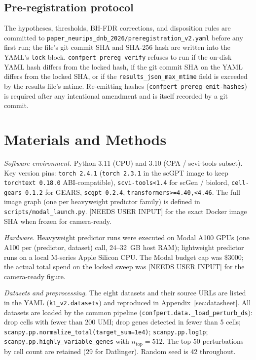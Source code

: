 \documentclass[11pt]{article}
\newcommand{\userinput}{{\color{orange}\textsf{[NEEDS USER INPUT]}}}
\begin{document}
\subsection{Pre-registration protocol}
The hypotheses, thresholds, BH-FDR corrections, and disposition rules
are committed to \texttt{paper\_neurips\_dnb\_2026/preregistration\_v2.yaml}
before any first run; the file's git commit SHA and SHA-256 hash are
written into the YAML's \texttt{lock} block. \texttt{confpert prereg
verify} refuses to run if the on-disk YAML hash differs from the locked
hash, if the git commit SHA on the YAML differs from the locked SHA, or
if the \texttt{results\_json\_max\_mtime} field is exceeded by the
results file's mtime. Re-emitting hashes
(\texttt{confpert prereg emit-hashes}) is required after any
intentional amendment and is itself recorded by a git commit.

\section{Materials and Methods}
\label{sec:methods}

\noindent\emph{Software environment.}
Python 3.11 (CPU) and 3.10 (CPA / scvi-tools subset). Key version pins:
\texttt{torch 2.4.1} (\texttt{torch 2.3.1} in the scGPT image to keep
\texttt{torchtext 0.18.0} ABI-compatible), \texttt{scvi-tools<1.4} for
scGen / biolord, \texttt{cell-gears 0.1.2} for GEARS,
\texttt{scgpt 0.2.4}, \texttt{transformers>=4.40,<4.46}. The full image
graph (one per heavyweight predictor family) is defined in
\texttt{scripts/modal\_launch.py}. \userinput{} for the exact Docker
image SHA when frozen for camera-ready.

\noindent\emph{Hardware.}
Heavyweight predictor runs were executed on Modal A100 GPUs (one A100
per (predictor, dataset) call, 24--32~GB host RAM); lightweight predictor
runs on a local M-series Apple Silicon CPU. The Modal budget cap was
\$3000; the actual total spend on the locked sweep was \userinput{} for
the camera-ready figure.

\noindent\emph{Datasets and preprocessing.}
The eight datasets and their source URLs are listed in the YAML
(\texttt{k1\_v2.datasets}) and reproduced in
Appendix~\ref{sec:datasheet}. All datasets are loaded by the
common pipeline (\texttt{confpert.data.\_load\_perturb\_ds}): drop
cells with fewer than 200 UMI; drop genes detected in fewer than 5
cells; \texttt{scanpy.pp.normalize\_total(target\_sum=1e4)};
\texttt{scanpy.pp.log1p}; \texttt{scanpy.pp.highly\_variable\_genes}
with $n_\text{top} = 512$. The top 50 perturbations by cell count are
retained (29 for Datlinger). Random seed is 42 throughout.
\end{document}
